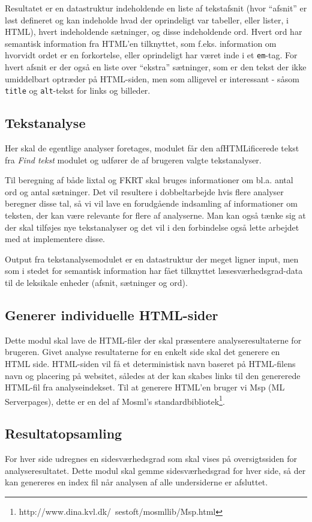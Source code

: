 \documentclass[a4paper,oneside,article, titlepage]{article}
\begin{document}
Resultatet er en datastruktur indeholdende en liste af tekstafsnit
(hvor ``afsnit'' er løst defineret og kan indeholde hvad der
oprindeligt var tabeller, eller lister, i HTML), hvert indeholdende
sætninger, og disse indeholdende ord. Hvert ord har semantisk
information fra HTML'en tilknyttet, som f.eks. information om hvorvidt
ordet er en forkortelse, eller oprindeligt har været inde i et
\texttt{em}-tag. For hvert afsnit er der også en liste over ``ekstra''
sætninger, som er den tekst der ikke umiddelbart optræder på
HTML-siden, men som alligevel er interessant - såsom \texttt{title} og
\texttt{alt}-tekst for links og billeder.

\subsection{Tekstanalyse}
Her skal de egentlige analyser foretages, modulet får den
afHTMLificerede tekst fra \textit{Find tekst} modulet og udfører de
af brugeren valgte tekstanalyser.

Til beregning af både lixtal og FKRT skal bruges informationer om
bl.a. antal ord og antal sætninger. Det vil resultere i dobbeltarbejde
hvis flere analyser beregner disse tal, så vi vil lave en forudgående
indsamling af informationer om teksten, der kan være relevante for
flere af analyserne. Man kan også tænke sig at der skal tilføjes nye
tekstanalyser og det vil i den forbindelse også lette arbejdet med at
implementere disse.

Output fra tekstanalysemodulet er en datastruktur der meget ligner
input, men som i stedet for semantisk information har fået tilknyttet
læsesværhedsgrad-data til de leksikale enheder (afsnit, sætninger og
ord).

\subsection{Generer individuelle HTML-sider}
Dette modul skal lave de HTML-filer der skal præsentere
analyseresultaterne for brugeren. Givet analyse resultaterne for en
enkelt side skal det generere en HTML side. HTML-siden vil få et
deterministisk navn baseret på HTML-filens navn og placering på
websitet, således at der kan skabes links til den genererede HTML-fil
fra analyseindekset. Til at generere HTML'en bruger vi Msp (ML
Serverpages), dette er en del af Mosml's
standardbibliotek\footnote{http://www.dina.kvl.dk/~sestoft/mosmllib/Msp.html}.

\subsection{Resultatopsamling}
For hver side udregnes en sidesværhedsgrad som skal vises på
oversigtssiden for analyseresultatet. Dette modul skal gemme
sidesværhedsgrad for hver side, så der kan genereres en index fil når
analysen af alle undersiderne er afsluttet.
\end{document}
